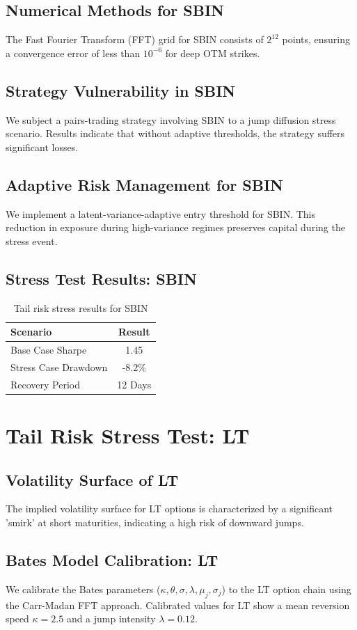 \documentclass[12pt,a4paper,twoside]{article}
\begin{document}
\subsection{Numerical Methods for SBIN}
The Fast Fourier Transform (FFT) grid for SBIN consists of $2^{12}$ points, ensuring a convergence error of less than $10^{-6}$ for deep OTM strikes.
\subsection{Strategy Vulnerability in SBIN}
We subject a pairs-trading strategy involving SBIN to a jump diffusion stress scenario. Results indicate that without adaptive thresholds, the strategy suffers significant losses.
\subsection{Adaptive Risk Management for SBIN}
We implement a latent-variance-adaptive entry threshold for SBIN. This reduction in exposure during high-variance regimes preserves capital during the stress event.
\subsection{Stress Test Results: SBIN}
\begin{table}[H]
\centering
\begin{tabular}{|l|c|}
\hline
Scenario & Result \\
\hline
Base Case Sharpe & 1.45 \\
Stress Case Drawdown & -8.2\% \\
Recovery Period & 12 Days \\
\hline
\end{tabular}
\caption{Tail risk stress results for SBIN}
\end{table}
\newpage

\section{Tail Risk Stress Test: LT}
\subsection{Volatility Surface of LT}
The implied volatility surface for LT options is characterized by a significant 'smirk' at short maturities, indicating a high risk of downward jumps.
\subsection{Bates Model Calibration: LT}
We calibrate the Bates parameters ($\kappa, \theta, \sigma, \lambda, \mu_j, \sigma_j$) to the LT option chain using the Carr-Madan FFT approach.
Calibrated values for LT show a mean reversion speed $\kappa = 2.5$ and a jump intensity $\lambda = 0.12$.
\end{document}
